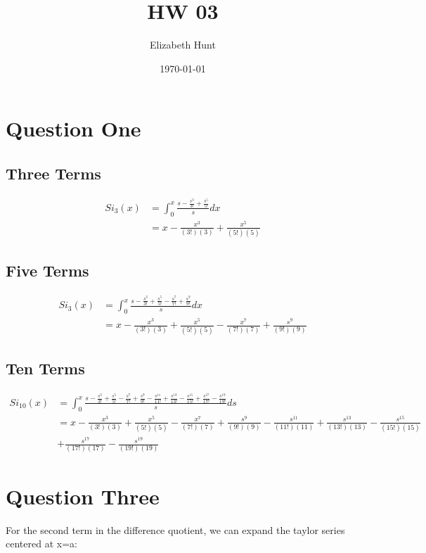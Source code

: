 \documentclass[11pt]{article}
\author{Elizabeth Hunt}
\date{\today}
\title{HW 03}
\begin{document}
\maketitle
\setlength\parindent{0pt}

\section{Question One}
\label{sec:org6f2bd27}
\subsection{Three Terms}
\label{sec:orgeb827ff}
\begin{align*}
Si_3(x) &= \int_0^x \frac{s - \frac{s^3}{3!} + \frac{s^5}{5!}}{s} dx \\
&= x - \frac{x^3}{(3!)(3)} + \frac{x^5}{(5!)(5)}
\end{align*}
\subsection{Five Terms}
\label{sec:orge6a15e4}
\begin{align*}
Si_3(x) &= \int_0^x \frac{s - \frac{s^3}{3!} + \frac{s^5}{5!} - \frac{s^7}{7!} + \frac{s^9}{9!}}{s} dx \\
&= x - \frac{x^3}{(3!)(3)} + \frac{x^5}{(5!)(5)} - \frac{x^7}{(7!)(7)} + \frac{s^9}{(9!)(9)}
\end{align*}
\subsection{Ten Terms}
\label{sec:orge87e346}
\begin{align*}
Si_{10}(x) &= \int_0^x \frac{s - \frac{s^3}{3!} + \frac{s^5}{5!} - \frac{s^7}{7!} + \frac{s^9}{9!} - \frac{s^{11}}{11!} + \frac{s^{13}}{13!} - \frac{s^{15}}{15!} + \frac{s^{17}}{17!} - \frac{s^{19}}{19!}}{s} ds \\
&= x - \frac{x^3}{(3!)(3)} + \frac{x^5}{(5!)(5)} - \frac{x^7}{(7!)(7)} + \frac{s^9}{(9!)(9)} - \frac{s^{11}}{(11!)(11)} + \frac{s^{13}}{(13!)(13)} - \frac{s^{15}}{(15!)(15)} \\
&+ \frac{s^{17}}{(17!)(17)} - \frac{s^{19}}{(19!)(19)}
\end{align*}
\section{Question Three}
\label{sec:org6e2f7fc}
For the second term in the difference quotient, we can expand the taylor series centered at x=a:
\end{document}
